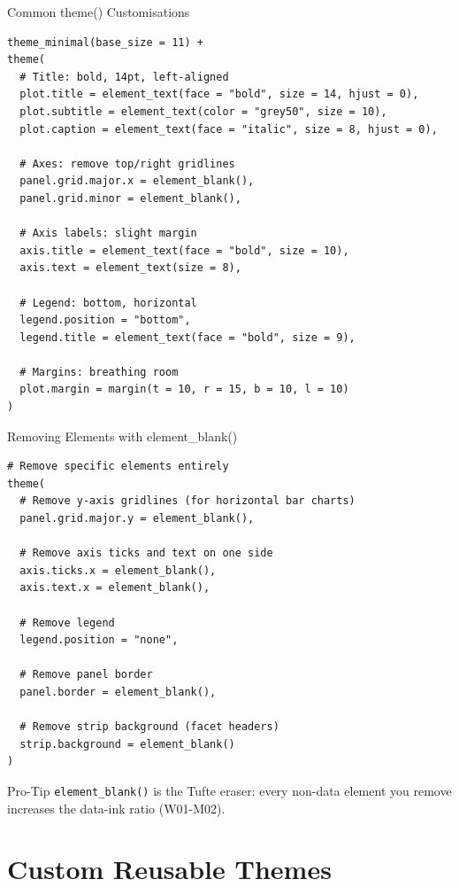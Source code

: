 \documentclass[10pt]{beamer}
\begin{document}
\begin{frame}[fragile]{Common theme() Customisations}
\begin{lstlisting}[style=rstyle]
theme_minimal(base_size = 11) +
theme(
  # Title: bold, 14pt, left-aligned
  plot.title = element_text(face = "bold", size = 14, hjust = 0),
  plot.subtitle = element_text(color = "grey50", size = 10),
  plot.caption = element_text(face = "italic", size = 8, hjust = 0),

  # Axes: remove top/right gridlines
  panel.grid.major.x = element_blank(),
  panel.grid.minor = element_blank(),

  # Axis labels: slight margin
  axis.title = element_text(face = "bold", size = 10),
  axis.text = element_text(size = 8),

  # Legend: bottom, horizontal
  legend.position = "bottom",
  legend.title = element_text(face = "bold", size = 9),

  # Margins: breathing room
  plot.margin = margin(t = 10, r = 15, b = 10, l = 10)
)
\end{lstlisting}
\end{frame}

\begin{frame}[fragile]{Removing Elements with element\_blank()}
\begin{lstlisting}[style=rstyle]
# Remove specific elements entirely
theme(
  # Remove y-axis gridlines (for horizontal bar charts)
  panel.grid.major.y = element_blank(),

  # Remove axis ticks and text on one side
  axis.ticks.x = element_blank(),
  axis.text.x = element_blank(),

  # Remove legend
  legend.position = "none",

  # Remove panel border
  panel.border = element_blank(),

  # Remove strip background (facet headers)
  strip.background = element_blank()
)
\end{lstlisting}
  \begin{alertblock}{Pro-Tip}
    \texttt{element\_blank()} is the Tufte eraser: every non-data
    element you remove increases the data-ink ratio (W01-M02).
  \end{alertblock}
\end{frame}

\section{Custom Reusable Themes}
\end{document}
